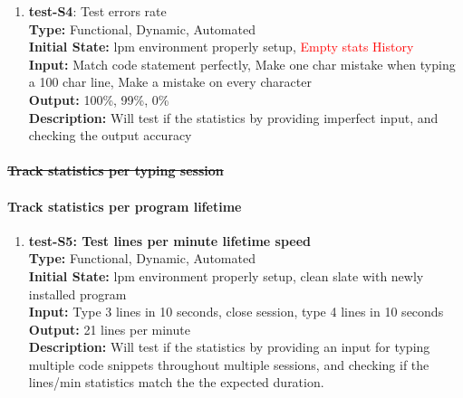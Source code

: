 \documentclass[12pt, titlepage]{article}
\begin{document}
\begin{enumerate}
\item{\textbf{test-S4}: Test errors rate\\}
\textbf{Type:} Functional, Dynamic, Automated \\
\textbf{Initial State:} lpm environment properly setup, \textcolor{red}{Empty stats History}\\
\textbf{Input:} Match code statement perfectly, Make one char mistake when typing a 100 char line, Make a mistake on every character\\
\textbf{Output:} 100\%, 99\%, 0\%\\
\textbf{Description:} Will test if the statistics by providing imperfect input, and checking the output accuracy
\end{enumerate}

\paragraph{\sout{Track statistics per typing session}}

\paragraph{Track statistics per program lifetime}
\begin{enumerate}
\item{\textbf{test-S5: Test lines per minute lifetime speed\\}}
\textbf{Type:} Functional, Dynamic, Automated\\
\textbf{Initial State:} lpm environment properly setup, clean slate with newly installed program \\
\textbf{Input:} Type 3 lines in 10 seconds, close session, type 4 lines in 10 seconds \\
\textbf{Output:} 21 lines per minute \\
\textbf{Description:} Will test if the statistics by providing an input for typing multiple code snippets throughout multiple sessions, and checking if the lines/min statistics match the the expected duration.\\
\end{enumerate}
\end{document}
